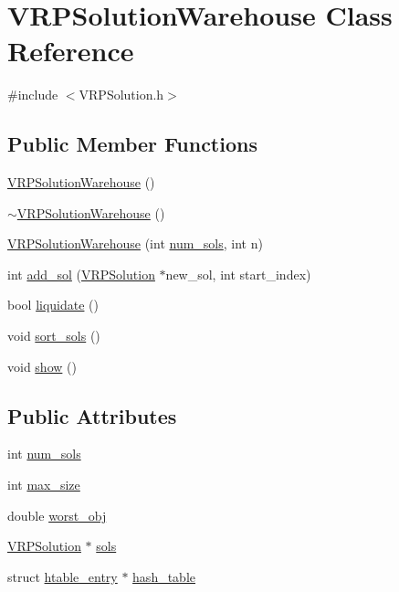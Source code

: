 \hypertarget{class_v_r_p_solution_warehouse}{
\section{VRPSolutionWarehouse Class Reference}
\label{class_v_r_p_solution_warehouse}
}


{\ttfamily \#include $<$VRPSolution.h$>$}

\subsection*{Public Member Functions}
\begin{DoxyCompactItemize}
\item 
\hyperlink{class_v_r_p_solution_warehouse_acf0e882c607001692d41cd49f8c5c01e}{VRPSolutionWarehouse} ()
\item 
\hyperlink{class_v_r_p_solution_warehouse_a67467b433b51320a18f509a9411ddcab}{$\sim$VRPSolutionWarehouse} ()
\item 
\hyperlink{class_v_r_p_solution_warehouse_af0487090ceba8fa90367d441b4e0c14a}{VRPSolutionWarehouse} (int \hyperlink{class_v_r_p_solution_warehouse_a3272c6071c468bee74e5a1c00c7704fe}{num\_\-sols}, int n)
\item 
int \hyperlink{class_v_r_p_solution_warehouse_a5b2e90a55b7928081b8a3f338fa8ebd8}{add\_\-sol} (\hyperlink{class_v_r_p_solution}{VRPSolution} $\ast$new\_\-sol, int start\_\-index)
\item 
bool \hyperlink{class_v_r_p_solution_warehouse_a94c005c32fc180a251c886a4c74db155}{liquidate} ()
\item 
void \hyperlink{class_v_r_p_solution_warehouse_a797b51d9424d05e742bbc8824d2ba3b4}{sort\_\-sols} ()
\item 
void \hyperlink{class_v_r_p_solution_warehouse_ac4005cc639daa9e11093bd763ac7e094}{show} ()
\end{DoxyCompactItemize}
\subsection*{Public Attributes}
\begin{DoxyCompactItemize}
\item 
int \hyperlink{class_v_r_p_solution_warehouse_a3272c6071c468bee74e5a1c00c7704fe}{num\_\-sols}
\item 
int \hyperlink{class_v_r_p_solution_warehouse_a6d4e647d02412160016f2077cc797e70}{max\_\-size}
\item 
double \hyperlink{class_v_r_p_solution_warehouse_a999b6c14614396ca2fc47a00d8d95a55}{worst\_\-obj}
\item 
\hyperlink{class_v_r_p_solution}{VRPSolution} $\ast$ \hyperlink{class_v_r_p_solution_warehouse_a509d78c5ebfba34d1354c09fdaaebeac}{sols}
\item 
struct \hyperlink{structhtable__entry}{htable\_\-entry} $\ast$ \hyperlink{class_v_r_p_solution_warehouse_a74c6f15c63291c409e6fc928c2e0e904}{hash\_\-table}
\end{DoxyCompactItemize}


